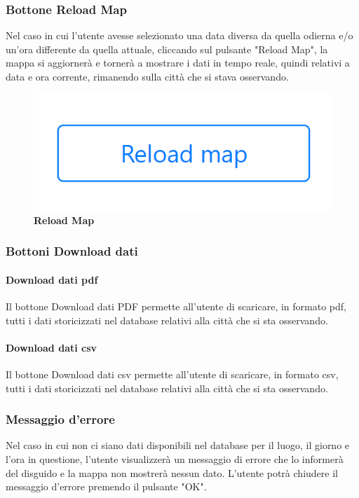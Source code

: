 \subsubsection{Bottone Reload Map} \label{UtilizzoDiGDPGatheringDetecionPlatformContenutoCentralePaginaInizialeHomeBottoneReloadMap}
Nel caso in cui l'utente avesse selezionato una data diversa da quella odierna e/o un'ora differente da quella attuale, cliccando sul pulsante "Reload Map", la mappa si aggiornerà e tornerà a mostrare i dati in tempo reale, quindi relativi a data e ora corrente, rimanendo sulla città che si stava osservando. 
\begin{center}
	\begin{figure}[H]
		\centering\includegraphics[width=0.3\linewidth]{../immagini/manualeUtente/ReloadMap.png}
		\caption{\textbf{Reload Map}}
	\end{figure}
\end{center}

\subsubsection{Bottoni Download dati} \label{UtilizzoDiGDPGatheringDetecionPlatformContenutoCentralePaginaInizialeHomeBottoneDownloadDati}
\paragraph{Download dati pdf} 
Il bottone Download dati PDF permette all'utente di scaricare, in formato pdf, tutti i dati storicizzati nel database relativi alla città che si sta osservando. 

\paragraph{Download dati csv} 
Il bottone Download dati csv permette all'utente di scaricare, in formato csv, tutti i dati storicizzati nel database relativi alla città che si sta osservando. 

\subsubsection{Messaggio d'errore} \label{UtilizzoDiGDPGatheringDetecionPlatformContenutoCentralePaginaInizialeHomeMessaggioDiErrore}
Nel caso in cui non ci siano dati disponibili nel database per il luogo, il giorno e l'ora in questione, l'utente visualizzerà un messaggio di errore che lo informerà del disguido e la mappa non mostrerà nessun dato. L'utente potrà chiudere il messaggio d'errore premendo il pulsante "OK". 


